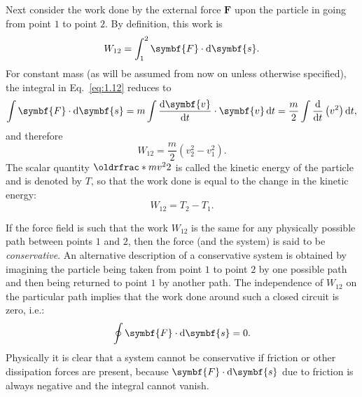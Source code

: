Next consider the work done by the external force \(\symbf{F}\) upon the particle in going from point \(1\) to point \(2\). By definition, this work is
\begin{equation}
    W_{12}=\int_1^2\symbf{F}\cdot\odif{\symbf{s}}.\label{eq:1.12}
\end{equation}
For constant mass (as will be assumed from now on unless otherwise specified), the integral in Eq.~\eqref{eq:1.12} reduces to
\begin{equation*}
    \int\symbf{F}\cdot\odif{\symbf{s}}=m\int\odv{\symbf{v}}{t}\cdot\symbf{v}\odif{t}=\frac{m}{2}\int\odv*{\left(v^2\right)}{t}\odif{t},
\end{equation*}
and therefore
\begin{equation}
    W_{12}=\frac{m}{2}\left(v_2^2-v_1^2\right).
\end{equation}
The scalar quantity \(\rfrac{mv^2}{2}\) is called the kinetic energy of the particle and is denoted by \(T\), so that the work done is equal to the change in the kinetic energy:
\begin{equation}
    W_{12}=T_2-T_1.\label{eq:1.14}
\end{equation}

If the force field is such that the work \(W_{12}\) is the same for any physically possible path between points \(1\) and \(2\), then the force (and the system) is said to be \emph{conservative}. An alternative description of a conservative system is obtained by imagining the particle being taken from point \(1\) to point \(2\) by one possible path and then being returned to point \(1\) by another path. The independence of \(W_{12}\) on the particular path implies that the work done around such a closed circuit is zero, i.e.:
\begin{equation}
    \oint\symbf{F}\cdot\odif{\symbf{s}}=0.
\end{equation}
Physically it is clear that a system cannot be conservative if friction or other dissipation forces are present, because \(\symbf{F}\cdot\odif{\symbf{s}}\) due to friction is always negative and the integral cannot vanish.

